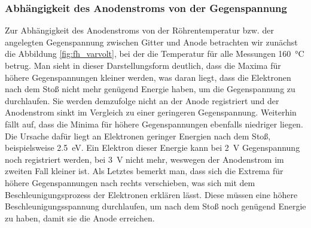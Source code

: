\documentclass[11pt, a4paper]{article}
\begin{document}
\subsubsection{Abhängigkeit des Anodenstroms von der Gegenspannung}

Zur Abhängigkeit des Anodenstroms von der Röhrentemperatur bzw. der angelegten Gegenspannung zwischen Gitter und Anode betrachten wir zunächst die Abbildung \ref{fig:fh_varvolt}, bei der die Temperatur für alle Messungen \SI{160}{\degreeCelsius} betrug.
Man sieht in dieser Darstellungsform deutlich, dass die Maxima für höhere Gegenspannungen kleiner werden, was daran liegt, dass die Elektronen nach dem Stoß nicht mehr genügend Energie haben, um die Gegenspannung zu durchlaufen.
Sie werden demzufolge nicht an der Anode registriert und der Anodenstrom sinkt im Vergleich zu einer geringeren Gegenspannung.
Weiterhin fällt auf, dass die Minima für höhere Gegenspannungen ebenfalls niedriger liegen.
Die Ursache dafür liegt an Elektronen geringer Energien nach dem Stoß, beispielsweise \SI{2.5}{\electronvolt}.
Ein Elektron dieser Energie kann bei \SI{2}{\volt} Gegenspannung noch registriert werden, bei \SI{3}{\volt} nicht mehr, weswegen der Anodenstrom im zweiten Fall kleiner ist.
Als Letztes bemerkt man, dass sich die Extrema für höhere Gegenspannungen nach rechts verschieben, was sich mit dem Beschleunigungsprozess der Elektronen erklären lässt.
Diese müssen eine höhere Beschleunigungsspannung durchlaufen, um nach dem Stoß noch genügend Energie zu haben, damit sie die Anode erreichen.
\end{document}
